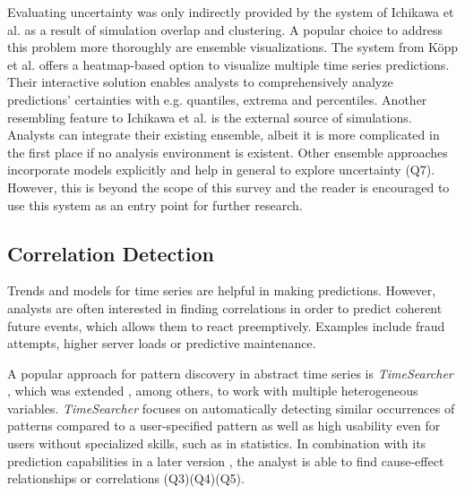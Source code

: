 \documentclass[electronic]{vgtc}             %
\begin{document}
Evaluating uncertainty was only indirectly provided by the system of Ichikawa et al. \cite{ichikawa:2002} as a result of simulation overlap and clustering.
A popular choice to address this problem more thoroughly are ensemble visualizations.
The system from K\"opp et al. \cite{koepp:2014} offers a heatmap-based option to visualize multiple time series predictions. 
Their interactive solution enables analysts to comprehensively analyze predictions' certainties with e.g. quantiles, extrema and percentiles. 
Another resembling feature to Ichikawa et al. \cite{ichikawa:2002} is the external source of simulations. 
Analysts can integrate their existing ensemble, albeit it is more complicated in the first place if no analysis environment is existent. 
Other ensemble approaches incorporate models explicitly and help in general to explore uncertainty (Q7).
However, this is beyond the scope of this survey and the reader is encouraged to use this system as an entry point for further research. 

\subsection{Correlation Detection\label{subsec:correlation}}
Trends and models for time series are helpful in making predictions.  
However, analysts are often interested in finding correlations in order to predict coherent future events, which allows them to react preemptively. 
Examples include fraud attempts, higher server loads or predictive maintenance.

A popular approach for pattern discovery in abstract time series is \textit{TimeSearcher} \cite{Hochheiser:2004}, which was extended \cite{buono:2005}, among others, to work with multiple heterogeneous variables.
\textit{TimeSearcher} focuses on automatically detecting similar occurrences of patterns compared to a user-specified pattern as well as high usability even for users without specialized skills, such as in statistics.
In combination with its prediction capabilities in a later version \cite{buono:2007}, the analyst is able to find cause-effect relationships or correlations (Q3)(Q4)(Q5).
\end{document}
